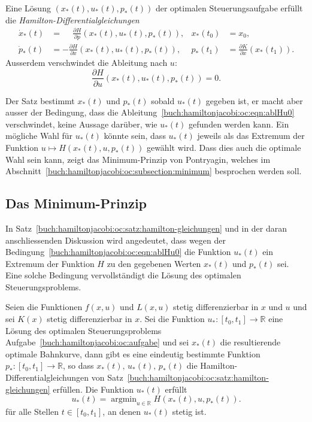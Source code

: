 \begin{satz}
\label{buch:hamiltonjacobi:oc:satz:hamilton-gleichungen}
%
Eine Lösung $(x_*(t),u_*(t),p_*(t))$ der optimalen Steuerungsaufgabe
erfüllt die {\em Hamilton-Differentialgleichungen}
\begin{align*}
\dot{x}_*(t)
&=
\phantom{-}
\frac{\partial H}{\partial p}(x_*(t),u_*(t),p_*(t)),
&
x_*(t_0)
&=
x_0,
\\
\dot{p}_*(t)
&=
-
\frac{\partial H}{\partial x}(x_*(t),u_*(t),p_*(t)),
&
p_*(t_1)
&=
\frac{\partial K}{\partial x}(x_*(t_1)).
\end{align*}
Ausserdem verschwindet die Ableitung nach $u$:
\begin{equation}
\frac{\partial H}{\partial u}(x_*(t),u_*(t),p_*(t))=0.
\label{buch:hamiltonjacobi:oc:eqn:ablHu0}
\end{equation}
\end{satz}

Der Satz bestimmt $x_*(t)$ und $p_*(t)$ sobald $u_*(t)$ gegeben ist,
er macht aber ausser der Bedingung, dass die
Ableitung~\eqref{buch:hamiltonjacobi:oc:eqn:ablHu0} verschwindet,
keine Aussage darüber, wie $u_*(t)$ gefunden werden kann.
Ein mögliche Wahl für $u_*(t)$ könnte sein, dass $u_*(t)$ jeweils
als das Extremum der Funktion $u\mapsto H(x_*(t),u,p_*(t))$
gewählt wird.
Dass dies auch die optimale Wahl sein kann, zeigt das Minimum-Prinzip
von Pontryagin, welches im
Abschnitt~\ref{buch:hamiltonjacobi:oc:subsection:minimum}
besprochen werden soll.

%
%
\subsection{Das Minimum-Prinzip
\label{buch:hamiltonjacobi:oc:subsection:minimum}}
In Satz~\ref{buch:hamiltonjacobi:oc:satz:hamilton-gleichungen}
und in der daran anschliessenden Diskussion wird angedeutet, dass
wegen der Bedingung~\eqref{buch:hamiltonjacobi:oc:eqn:ablHu0}
die Funktion $u_*(t)$ ein Extremum der Funktion $H$ zu den gegebenen
Werten $x_*(t)$ und $p_*(t)$ sei.
Eine solche Bedingung vervollständigt die Lösung des optimalen
Steuerungsproblems.

\begin{satz}[Pontryagin]
Seien die Funktionen $f(x,u)$ und $L(x,u)$ stetig differenzierbar in 
$x$ und $u$ und sei $K(x)$ stetig differenzierbar in $x$.
Sei die Funktion $u_*\colon[t_0,t_1]\to\mathbb{R}$ eine Lösung des
optimalen Steuerungsproblems Aufgabe~\ref{buch:hamiltonjacobi:oc:aufgabe}
und sei $x_*(t)$ die resultierende optimale Bahnkurve, dann gibt es
eine eindeutig bestimmte Funktion $p_*\colon[t_0,t_1]\to\mathbb{R}$,
so dass $x_*(t),\,u_*(t),\,p_*(t)$ die Hamilton-Differentialgleichungen
von Satz~\ref{buch:hamiltonjacobi:oc:satz:hamilton-gleichungen}
erfüllen.
Die Funktion $u_*(t)$ erfüllt
\begin{equation}
u_*(t)
=
\operatorname{argmin}_{u\in\mathbb{R}} H(x_*(t),u,p_*(t)).
\label{buch:hamiltonjacobi:oc:eqn:argminH}
\end{equation}
für alle Stellen $t\in[t_0,t_1]$, an denen $u_*(t)$ stetig ist.
\end{satz}


